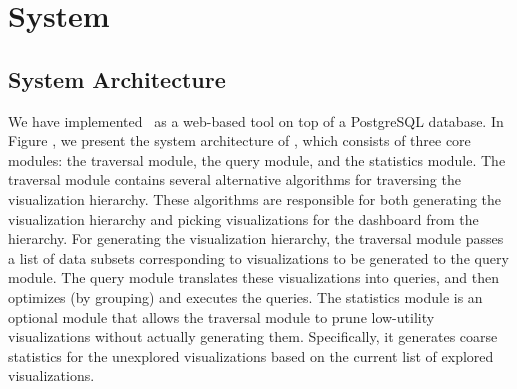 \newpage
\section{System}
\subsection{System Architecture}
We have implemented \system\ as a web-based tool on top of a PostgreSQL database. In Figure \label{system_architecture}, we present the system architecture of \system, which consists of three core modules: the traversal module, the query module, and the statistics module. The traversal module contains several alternative algorithms for traversing the visualization hierarchy. These algorithms are responsible for both generating the visualization hierarchy and picking visualizations for the dashboard from the hierarchy. For generating the visualization hierarchy, the traversal module passes a list of data subsets corresponding to visualizations to be generated to the query module. The query module translates these visualizations into queries, and then optimizes (by grouping) and executes the queries. The statistics module is an optional module that allows the traversal module to prune low-utility visualizations without actually generating them. Specifically, it generates coarse statistics for the unexplored visualizations based on the current list of explored visualizations. 
\begin{center}
\label{system_architecture}
\end{center}

